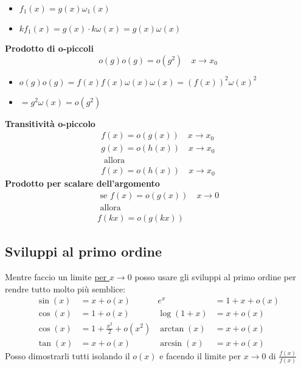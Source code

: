 \begin{itemize}
	\item $f_1\left( x \right) = g\left( x \right) \omega_1 \left( x \right) $
	\item $kf_1\left( x \right) = g\left( x \right)\cdot k\omega \left( x \right) = g\left( x \right) \omega \left( x \right)  $
\end{itemize}
\textbf{Prodotto di o-piccoli}
\[
	o\left( g \right) o\left( g \right) = o\left( g^2 \right) \quad x \to x_0
\]
\begin{itemize}
	\item $o\left( g \right) o\left( g \right) = f\left( x \right) f\left( x \right) \omega \left( x \right) \omega \left( x \right)= \left( f\left( x \right) \right) ^2 \omega \left( x \right) ^2 $
	\item $= g^2 \omega \left( x \right) = o\left( g^2 \right)  $
\end{itemize}
\textbf{Transitività o-piccolo}
\begin{gather*}
	f\left( x \right) = o\left( g\left( x \right)  \right) \quad x \to x_0 \\
	g\left( x \right) = o\left( h\left( x \right)  \right) \quad x \to x_0	\\
	\text{ allora }\\
	f\left( x \right) = o\left( h\left( x \right)  \right) \quad x \to x_0
\end{gather*}
\textbf{Prodotto per scalare dell'argomento}
\begin{gather*}
	\text{ se }f\left( x \right) = o\left( g\left( x \right)  \right) \quad x \to 0\\
	\text{ allora }\\
	f\left( kx \right) = o\left( g\left( kx \right)  \right)
\end{gather*}
\subsection{Sviluppi al primo ordine}
Mentre faccio un limite \underline{per $x \to 0$} posso usare gli sviluppi al primo ordine per rendre tutto molto più semblice:
\begin{align*}
	\sin\left( x \right) & = x + o\left( x \right)                    & e^{x}                    & = 1 + x + o\left( x \right) \\
	\cos\left( x \right) & =  1 + o\left( x \right)                   & \log\left( 1 + x \right) & = x + o\left( x \right)     \\
	\cos\left( x \right) & =  1 + \frac{x^2}{2} + o\left( x^2 \right) & \arctan\left( x \right)  & = x + o\left( x \right)     \\
	\tan\left( x \right) & =  x + o\left( x \right)                   & \arcsin \left( x \right) & =  x + o\left( x \right)
\end{align*}
Posso dimostrarli tutti isolando il $o\left( x \right) $ e facendo il limite per $x \to 0$ di $\frac{f\left( x \right) }{f\left( x \right) }$
